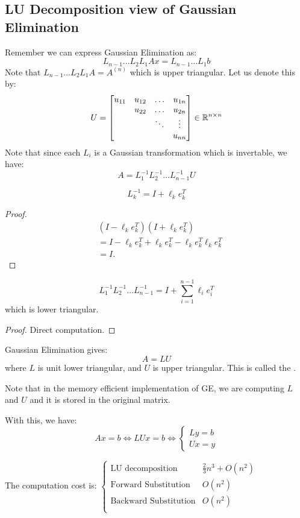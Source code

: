 \documentclass[../main/main.tex]{subfiles}
\begin{document}
\subsection{LU Decomposition view of Gaussian Elimination}
Remember we can express Gaussian Elimination as: \[
L_{n-1}\ldots L_{2}L_{1} Ax = L_{n-1} \ldots L_{1} b
\]
Note that $L_{n-1}\ldots L_{2}L_{1} A = A^{(n)}$ which is upper triangular. Let us denote this by: \[
U = \begin{bmatrix}
  u_{11} & u_{12} & \ldots & u_{1n}\\
   & u_{22} & \ldots & u_{2n}\\
   &  & \ddots &\vdots \\
   &  &  & u_{nn}\\
\end{bmatrix} \in \mathbb{R}^{n \times n}
\]
Note that since each $L_{i}$ is a Gaussian transformation which is invertable, we have: \[
A = L^{-1}_{1}L^{-1}_{2}\ldots L^{-1}_{n-1} U
\]
\begin{theorem}
  \[
    L^{-1}_{k} = I + \ell_{k} e^{T}_{k}
  \]
\end{theorem}
\begin{proof}
\begin{align*}
 & (I - \ell_{k}e^{T}_{k}) (I + \ell_{k}e^{T}_{k}) \\
  &= I - \ell_{k}e^{T}_{k}+\ell_{k}e^{T}_{k} - \ell_{k } e^{T}_{k}\ell_{k}e^{T}_{k} \\
    &= I
  .\end{align*}
\end{proof}
\begin{theorem}
  \[
    L^{-1}_{1}L_2^{-1}\ldots L_{n-1}^{-1} = I + \sum_{i=1}^{n-1} \ell_{i}e_{i}^{T}
  \]
  which is lower triangular.
\end{theorem}
\begin{proof}
Direct computation.
\end{proof}
\begin{theorem}
  Gaussian Elimination gives: \[
  A = LU\] where $L$ is unit lower triangular, and $U$ is upper triangular. This is called the .
\end{theorem}
\begin{remark}
  Note that in the memory efficient implementation of GE, we are computing $L$ and $U$ and it is stored in the original matrix.
\end{remark}
With this, we have: \[
Ax = b \iff LUx = b \iff \begin{cases}
  Ly = b \\
  Ux = y
\end{cases}
\]
\begin{theorem}
The computation cost is: $\begin{cases}
  \text{LU decomposition} & \frac{2}{3}n^{3} + O(n^2)\\
  \text{Forward Substitution} &  O(n^2)\\
  \text{Backward Substitution} &  O(n^2)\\
\end{cases}$
\end{theorem}
\end{document}
